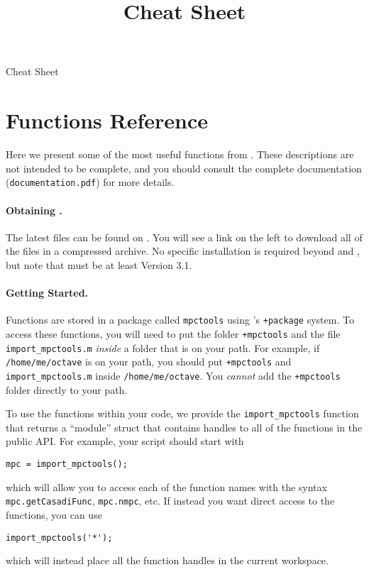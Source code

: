 \documentclass{article}
\title{\mpctools{} \octave{} Cheat Sheet}
\begin{document}
\begin{center}
    \LARGE \mpctools{} \octave{} Cheat Sheet
\end{center}

\section{Functions Reference}

Here we present some of the most useful functions from \mpctools{}.
These descriptions are not intended to be complete, and you should consult the complete documentation (\texttt{documentation.pdf}) for more details.

\begin{multicols}{2}

\paragraph*{Obtaining \mpctools{}.}

The latest files can be found on \bitbucketlink{}.
You will see a link on the left to download all of the files in a compressed archive.
No specific installation is required beyond \octave{} and \casadi{}, but note that \casadi{} must be at least Version 3.1.

\paragraph*{Getting Started.}

Functions are stored in a package called \texttt{mpctools} using \octave{}'s \texttt{+package} system.
To access these functions, you will need to put the folder \texttt{+mpctools} and the file \texttt{import\_mpctools.m} \emph{inside} a folder that is on your \octave{} path.
For example, if \texttt{/home/me/octave} is on your \octave{} path, you should put \texttt{+mpctools} and \texttt{import\_mpctools.m} inside \texttt{/home/me/octave}.
You \emph{cannot} add the \texttt{+mpctools} folder directly to your path.

To use the functions within your code, we provide the \texttt{import\_mpctools} function that returns a ``module'' struct that contains handles to all of the functions in the public API.
For example, your script should start with
%
\begin{lstlisting}[frame=L]
mpc = import_mpctools();
\end{lstlisting}
%
which will allow you to access each of the function names with the syntax \texttt{mpc.getCasadiFunc}, \texttt{mpc.nmpc}, etc.
If instead you want direct access to the functions, you can use
%
\begin{lstlisting}[frame=L]
import_mpctools('*');
\end{lstlisting}
%
which will instead place all the function handles in the current workspace.


\end{multicols}
\end{document}
